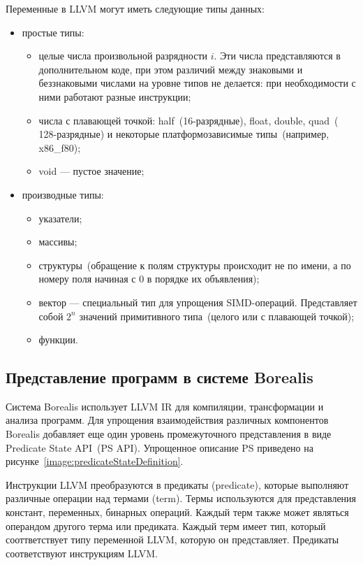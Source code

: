Переменные в LLVM могут иметь следующие типы данных:
\begin{itemize}
\item простые типы:
    \begin{itemize}
    \item целые числа произвольной разрядности $i$. Эти числа представляются в 
    дополнительном коде, при этом различий между знаковыми и беззнаковыми 
    числами на уровне типов не делается: при необходимости с ними работают 
    разные инструкции;
    \item числа с плавающей точкой: half~(16-разрядные), float, double, quad~(
    128-разрядные) и некоторые платформозависимые типы~(например, x86\_f80);
    \item void --- пустое значение;
    \end{itemize}

\item производные типы:
    \begin{itemize}
    \item указатели;
    \item массивы;
    \item структуры~(обращение к полям структуры происходит не по имени, а по 
    номеру поля начиная с 0 в порядке их объявления);
    \item вектор --- специальный тип для упрощения SIMD-операций. Представляет 
    собой $2^n$ значений примитивного типа~(целого или с плавающей точкой);
    \item функции.
    \end{itemize}
\end{itemize}

\subsection{Представление программ в системе Borealis}
Система Borealis использует LLVM IR для компиляции, трансформации и анализа 
программ. Для упрощения взаимодействия различных компонентов Borealis 
добавляет еще один уровень промежуточного представления в виде Predicate State 
API~(PS API). Упрощенное описание PS приведено на 
рисунке~\ref{image:predicateStateDefinition}.

Инструкции LLVM преобразуются в предикаты (predicate), которые выполняют 
различные операции над термами (term). Термы используются для представления 
констант, переменных, бинарных операций. Каждый терм также может являться 
операндом другого терма или предиката. Каждый терм имеет тип, который 
сооттветствует типу переменной LLVM, которую он представляет. Предикаты 
соответствуют инструкциям LLVM.
    
